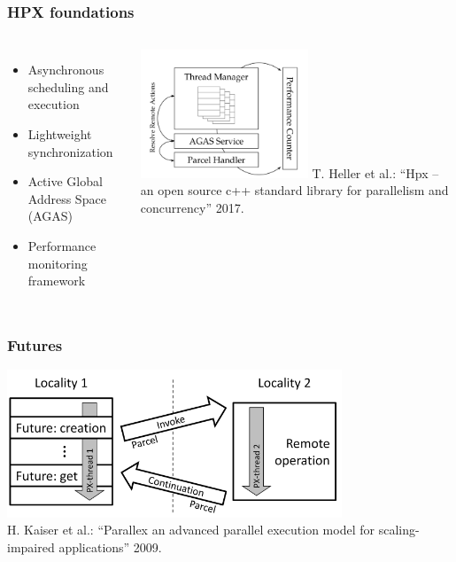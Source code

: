 \documentclass[compress]{beamer}
\begin{document}
\begin{frame}
	\frametitle{HPX foundations}
	\begin{columns}
		\column{\dimexpr\linewidth-50mm-2mm}
		\begin{itemize}
			\item Asynchronous scheduling and execution
			\item Lightweight synchronization
			\item Active Global Address Space (AGAS)
			\item Performance monitoring framework
		\end{itemize}
		\column{50mm}
	 		\includegraphics[width=50mm]{Figures/hpxArchitecture.png}
	 		\tiny T. Heller et al.: “Hpx – an open source c++ standard library for parallelism and concurrency” 2017.
		\normalsize
	\end{columns}
\end{frame}

\begin{frame}
	\frametitle{Futures}
	\begin{center}
		\includegraphics[width=100mm]{Figures/futureFlowDiagram.png}\\
		\tiny H. Kaiser et al.: “Parallex an advanced parallel
execution model for scaling-impaired applications” 2009.
		\normalsize
	\end{center}
\end{frame}
\end{document}

